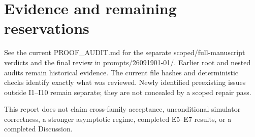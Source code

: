 \documentclass[10pt]{article}
\begin{document}
\section*{Evidence and remaining reservations}
See the current PROOF\_AUDIT.md for the separate scoped/full-manuscript verdicts and the final review in prompts/26091901-01/. Earlier root and nested audits remain historical evidence. The current file hashes and deterministic checks identify exactly what was reviewed. Newly identified preexisting issues outside I1--I10 remain separate; they are not concealed by a scoped repair pass.

This report does not claim cross-family acceptance, unconditional simulator correctness, a stronger asymptotic regime, completed E5--E7 results, or a completed Discussion.
\end{document}

